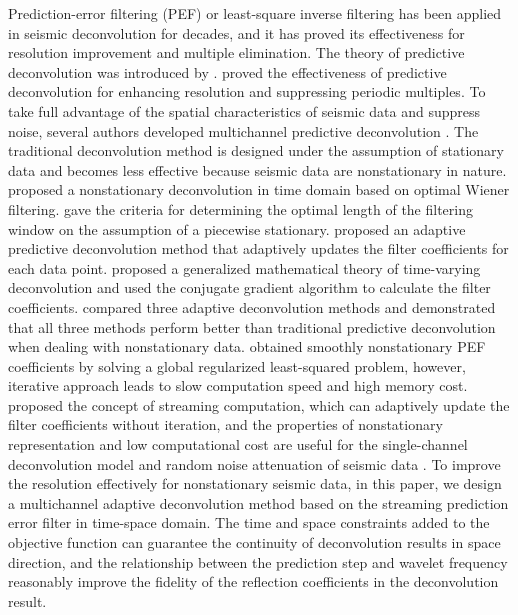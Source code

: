 Prediction-error filtering (PEF) or least-square inverse filtering has
been applied in seismic deconvolution for decades, and it has proved
its effectiveness for resolution improvement and multiple
elimination. The theory of predictive deconvolution was introduced by
\cite{Robinson57, Robinson67}.  \cite{Peacock69} proved the
effectiveness of predictive deconvolution for enhancing resolution and
suppressing periodic multiples.  To take full advantage of the spatial
characteristics of seismic data and suppress noise, several authors
developed multichannel predictive deconvolution \cite[]{Claerbout76,
  Porsani07, Li16}. The traditional deconvolution method is designed
under the assumption of stationary data and becomes less effective
because seismic data are nonstationary in nature.  \cite{Clarke68}
proposed a nonstationary deconvolution in time domain based on optimal
Wiener filtering. \cite{Wang69} gave the criteria for determining the
optimal length of the filtering window on the assumption of a
piecewise stationary. \cite{Griffiths77} proposed an adaptive
predictive deconvolution method that adaptively updates the filter
coefficients for each data point. \cite{Koehler85} proposed a
generalized mathematical theory of time-varying deconvolution and used
the conjugate gradient algorithm to calculate the filter coefficients.
\cite{Prasad80} compared three adaptive deconvolution methods and
demonstrated that all three methods perform better than traditional
predictive deconvolution when dealing with nonstationary data.
\cite{Liu11} obtained smoothly nonstationary PEF coefficients by
solving a global regularized least-squared problem, however, iterative
approach leads to slow computation speed and high memory cost.
\cite{Fomel16} proposed the concept of streaming computation, which
can adaptively update the filter coefficients without iteration, and
the properties of nonstationary representation and low computational
cost are useful for the single-channel deconvolution model and random
noise attenuation of seismic data \cite[]{Liu18}. To improve the
resolution effectively for nonstationary seismic data, in this paper,
we design a multichannel adaptive deconvolution method based on the
streaming prediction error filter in time-space domain. The time and
space constraints added to the objective function can guarantee the
continuity of deconvolution results in space direction, and the
relationship between the prediction step and wavelet frequency
reasonably improve the fidelity of the reflection coefficients in the
deconvolution result.


